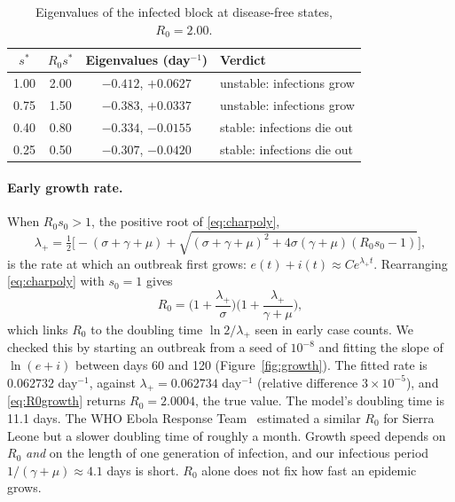 \documentclass[11pt,a4paper]{article}
\begin{document}
\begin{table}[htbp]
\centering
\caption{Eigenvalues of the infected block at disease-free states, $R_0 = 2.00$.}
\label{tab:eigs}
\begin{tabular}{cccl}
\toprule
$s^*$ & $R_0 s^*$ & Eigenvalues (day$^{-1}$) & Verdict \\
\midrule
1.00 & 2.00 & $-0.412$, $+0.0627$ & unstable: infections grow \\
0.75 & 1.50 & $-0.383$, $+0.0337$ & unstable: infections grow \\
0.40 & 0.80 & $-0.334$, $-0.0155$ & stable: infections die out \\
0.25 & 0.50 & $-0.307$, $-0.0420$ & stable: infections die out \\
\bottomrule
\end{tabular}
\end{table}

\paragraph{Early growth rate.} When $R_0 s_0 > 1$, the positive root of \eqref{eq:charpoly},
\begin{equation}
    \lambda_+ = \tfrac{1}{2}\Big[-(\sigma + \gamma + \mu) + \sqrt{(\sigma + \gamma + \mu)^2 + 4\sigma(\gamma + \mu)(R_0 s_0 - 1)}\Big],
\end{equation}
is the rate at which an outbreak first grows: $e(t) + i(t) \approx C e^{\lambda_+ t}$. Rearranging \eqref{eq:charpoly} with $s_0 = 1$ gives
\begin{equation}
    R_0 = \Big(1 + \frac{\lambda_+}{\sigma}\Big)\Big(1 + \frac{\lambda_+}{\gamma + \mu}\Big),
    \label{eq:R0growth}
\end{equation}
which links $R_0$ to the doubling time $\ln 2/\lambda_+$ seen in early case counts. We checked this by starting an outbreak from a seed of $10^{-8}$ and fitting the slope of $\ln(e+i)$ between days 60 and 120 (Figure~\ref{fig:growth}). The fitted rate is $0.062732$ day$^{-1}$, against $\lambda_+ = 0.062734$ day$^{-1}$ (relative difference $3\times10^{-5}$), and \eqref{eq:R0growth} returns $R_0 = 2.0004$, the true value. The model's doubling time is 11.1 days. The WHO Ebola Response Team~\cite{who2014ebola} estimated a similar $R_0$ for Sierra Leone but a slower doubling time of roughly a month. Growth speed depends on $R_0$ \emph{and} on the length of one generation of infection, and our infectious period $1/(\gamma+\mu) \approx 4.1$ days is short. $R_0$ alone does not fix how fast an epidemic grows.
\end{document}
